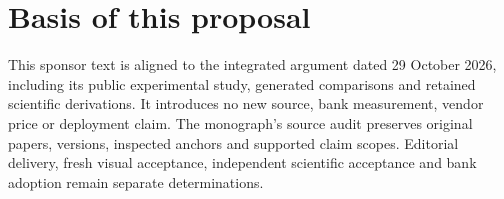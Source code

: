 \section*{Basis of this proposal}
This sponsor text is aligned to the integrated argument dated
29 October 2026, including its public experimental study, generated
comparisons and retained scientific derivations. It introduces no new source, bank measurement,
vendor price or deployment claim. The monograph's source audit preserves
original papers, versions, inspected anchors and supported claim scopes.
Editorial delivery, fresh visual acceptance, independent scientific
acceptance and bank adoption remain separate determinations.
